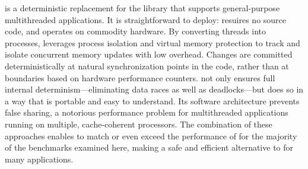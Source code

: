 \label{sec:conclusion}

\dthreads{} is a deterministic replacement for the \pthreads{}
library that supports general-purpose multithreaded
applications. It is straightforward to deploy:
\dthreads{} resuires no source code, and operates on commodity hardware. By converting threads
into processes, \dthreads{} leverages process isolation and virtual
memory protection to track and isolate concurrent memory updates with
low overhead. Changes are committed deterministically at natural
synchronization points in the code, rather than at boundaries based on
hardware performance counters. \dthreads{} not only ensures full
internal determinism---eliminating data races as well as
deadlocks---but does so in a way that is portable and easy to
understand. Its software architecture prevents false sharing, a
notorious performance problem for multithreaded applications running
on multiple, cache-coherent processors. The combination of these
approaches enables \dthreads{} to match or even exceed the performance
of \pthreads{} for the majority of the benchmarks examined here,
making \dthreads{} a safe and efficient alternative to \pthreads{} for
many applications.
